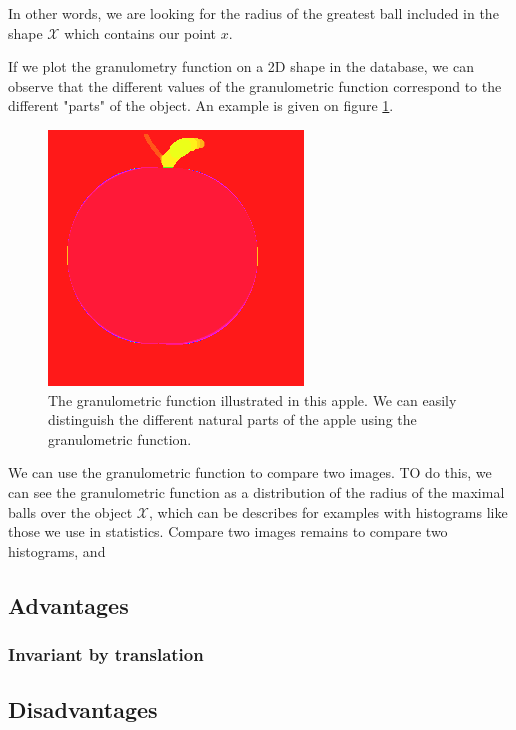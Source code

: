 In other words, we are looking for the radius of the greatest ball included in the shape $\mathcal{X}$ which contains our point $x$.

If we plot the granulometry function on a 2D shape in the database, we can observe that the different values of the granulometric function correspond to the different "parts" of the object. An example is given on figure \ref{apple-granulo}.


\begin{figure}[!ht]
	\centering
	\includegraphics[scale=0.5]{images/test-apple-1.png}
	\caption{The granulometric function illustrated in this apple. We can easily distinguish the different natural parts of the apple using the granulometric function.}
	\label{apple-granulo}
\end{figure}

We can use the granulometric function to compare two images. TO do this, we can see the granulometric function as a distribution of the radius of the maximal balls over the object $\mathcal{X}$, which can be describes for examples with histograms like those we use in statistics. Compare two images remains to compare two histograms, and 

\subsection{Advantages}

\subsubsection{Invariant by translation}



\subsection{Disadvantages}

